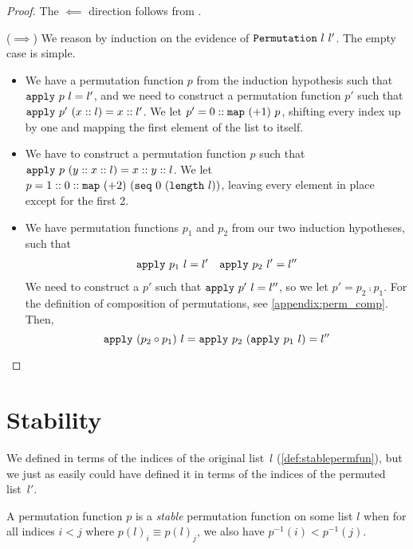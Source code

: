 \documentclass[sigplan,10pt,anonymous,review]{thesis}
\begin{document}
\permutationexiff*
\begin{proof}
  The $\impliedby$ direction follows from .

  ($\implies$) We reason by induction on the evidence of
  $\texttt{\textup{Permutation}}~l~l'$. The empty case is simple.
  \begin{itemize}
  \item We have a permutation function $p$ from the induction
    hypothesis such that $\texttt{\textup{apply}}~p~l = l'$, and we need to
    construct a permutation function $p'$ such that
    $\texttt{\textup{apply}}~p'~(x::l) = x :: l'$. We let $p' = 0 ::
    \texttt{\textup{map}}~(+1)~p$, shifting every index up by one and mapping
    the first element of the list to itself.
  \item We have to construct a permutation function $p$ such that
    $\texttt{\textup{apply}}~p~(y :: x :: l) = x :: y :: l$. We let $p = 1 :: 0 ::
    \texttt{\textup{map}}~(+2)~(\texttt{\textup{seq}}~0~(\texttt{\textup{length}}~l))$, leaving every
    element in place except for the first 2.
  \item We have permutation functions $p_1$ and $p_2$ from our two
    induction hypotheses, such that
    \begin{align*}
      \texttt{\textup{apply}}~p_1~l = l' && \texttt{\textup{apply}}~p_2~l' = l''
    \end{align*}
    We need to construct a $p'$ such that $\texttt{\textup{apply}}~p'~l=l''$, so
    we let $p' = p_2 \comp p_1$. For the definition of composition of
    permutations, see \cref{appendix:perm_comp}. Then,
    \begin{equation*}
      \texttt{\textup{apply}}~(p_2 \circ p_1)~l =
      \texttt{\textup{apply}}~p_2~(\texttt{\textup{apply}}~p_1~l) = l'' \qedhere
    \end{equation*}
  \end{itemize}
\end{proof}

\section{Stability}
\label{appendix:stability}

We defined  in terms of the indices of the original
list~$l$ (\cref{def:stablepermfun}), but we just as easily could have
defined it in terms of the indices of the permuted list~$l'$.

\begin{definition}
  A permutation function $p$ is a \textit{stable} permutation function
  on some list $l$ when for all indices $i < j$ where $p(l)_i \equiv p(l)_j$, we
  also have $p^{-1}(i) < p^{-1}(j)$.
\end{definition}
\end{document}
